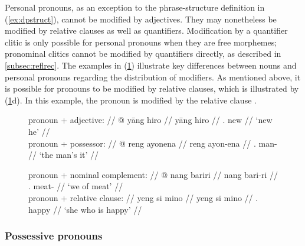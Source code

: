 Personal pronouns, as an exception to the phrase-structure definition in
(\ref{ex:dpstruct}), cannot be modified by adjectives. They may nonetheless be
modified by relative clauses as well as quantifiers. Modification by a
quantifier clitic is only possible for personal pronouns when they are free
morphemes; pronominal clitics cannot be modified by quantifiers directly, as
described in \autoref{subsec:reflrec}. The examples in (\ref{ex:nonounmods})
illustrate key differences between nouns and personal pronouns regarding the
distribution of modifiers. As mentioned above, it is possible for pronouns to
be modified by relative clauses, which is illustrated by
(\ref{ex:nonounmods}d). In this example, the pronoun  is
modified by the relative clause .

\begin{figure}[h]
\ex{}\label{ex:nonounmods}
\begin{minipage}[t]{.5\remaining}
\tl\quad%
	\begingl
		\glpreamble pronoun + adjective: //
		\gla * @ yāng hiro //
		\glb {} yāng hiro //
		\glc {} \TsgM{}.\Aarg{} new //
		\glft \hphantom{*}`new he' //
	\endgl\smallskip\\

\tl\quad%
	\begingl
		\glpreamble pronoun + possessor: //
		\gla * @ reng ayonena //
		\glb {} reng ayon-ena //
		\glc {} \TsgI{}.\Aarg{} man-\Gen{} //
		\glft \hphantom{*}`the man's it' //
	\endgl
\end{minipage}
\begin{minipage}[t]{.5\remaining}
\tl\quad%
	\begingl
		\glpreamble pronoun + nominal complement: //
		\gla * @ nang bariri //
		\glb {} nang bari-ri //
		\glc {} \Fpl{}.\Aarg{} meat-\Ins{} //
		\glft \hphantom{*}`we of meat' //
	\endgl\smallskip\\

\tl\quad%
	\begingl
		\glpreamble pronoun + relative clause: //
		\gla yeng si mino //
		\glb yeng si mino //
		\glc \TsgF{}.\Aarg{} \Rel{} happy //
		\glft `she who is happy' //
	\endgl
\end{minipage}
\xe
\end{figure}


\subsubsection{Possessive pronouns}
\label{ex:subsubsec:possprosyn}

